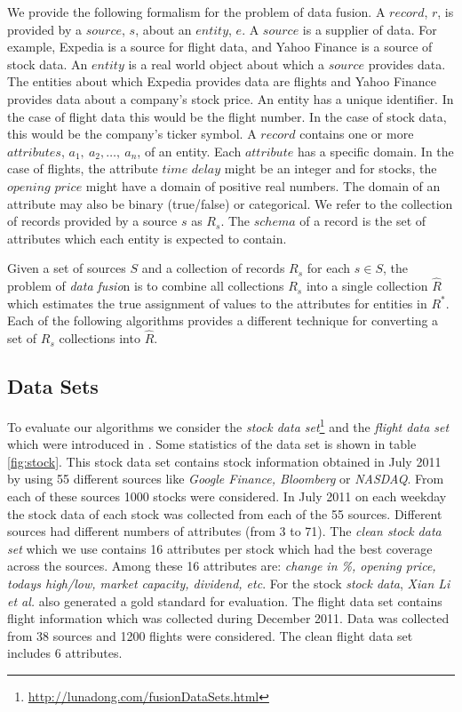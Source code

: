 \documentclass{acm_proc_article-sp}
\begin{document}
We provide the following formalism for the problem of data fusion. A $record$, $r$, is provided by a $source$, $s$, about an $entity$, $e$. A $source$ is a supplier of data. For example, Expedia is a source for flight data, and Yahoo Finance is a source of stock data.  An $entity$ is a real world object about which a $source$ provides data. The entities about which Expedia provides data are flights and Yahoo Finance provides data about a company's stock price. An entity has a unique identifier. In the case of flight data this would be the flight number. In the case of stock data, this would be the company's ticker symbol. A $record$ contains one or more $attributes$, $a_1,\ a_2,\dots,\ a_n$, of an entity. Each $attribute$ has a specific domain. In the case of flights, the attribute $time$ $delay$ might be an integer and for stocks, the $opening$ $price$ might have a domain of positive real numbers.  The domain of an attribute may also be binary (true/false) or categorical. We refer to the collection of records provided by a source $s$ as $R_s$. The $schema$ of a record is the set of attributes which each entity is expected to contain.

Given a set of sources $S$ and a collection of records $R_s$ for each $s \in S$, the problem of \emph{data fusio}n is to combine all collections $R_s$ into a single collection $\hat{R}$ which estimates the true assignment of values to the attributes for entities in $R^*$.  Each of the following algorithms provides a different technique for converting a set of $R_s$ collections into $\hat{R}$. 

\subsection{Data Sets}
To evaluate our algorithms we consider the \emph{stock data set}\footnote{\url{http://lunadong.com/fusionDataSets.html}} and the \emph{flight data set} which were introduced in \cite{li:truth}. Some statistics of the data set is shown in table \ref{fig:stock}. This stock data set contains stock information obtained in July 2011 by using 55 different sources like \emph{Google Finance, Bloomberg} or \emph{NASDAQ}. From each of these sources 1000 stocks were considered. In July 2011 on each weekday the stock data of each stock was collected from each of the 55 sources. Different sources had different numbers of attributes (from 3 to 71). The \emph{clean stock data set} which we use contains 16 attributes per stock which had the best coverage across the sources. Among these 16 attributes are: \emph{change in \%, opening price, todays high/low, market capacity, dividend, etc}. For the stock \emph{stock data}, \emph{Xian Li et al.} \cite{li:truth} also generated a gold standard for evaluation.
The flight data set contains flight information which was collected during December 2011. Data was collected from 38 sources and 1200 flights were considered. The clean flight data set includes 6 attributes.
\end{document}
